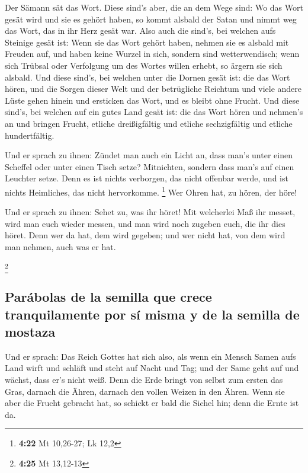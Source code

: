  Der Sämann sät das Wort.  Diese sind's
aber, die an dem Wege sind: Wo das Wort gesät wird und sie es gehört
haben, so kommt alsbald der Satan und nimmt weg das Wort, das in ihr
Herz gesät war.  Also auch die sind's, bei welchen aufs
Steinige gesät ist: Wenn sie das Wort gehört haben, nehmen sie es
alsbald mit Freuden auf,  und haben keine Wurzel in sich,
sondern sind wetterwendisch; wenn sich Trübsal oder Verfolgung um des
Wortes willen erhebt, so ärgern sie sich alsbald.  Und
diese sind's, bei welchen unter die Dornen gesät ist: die das Wort
hören,  und die Sorgen dieser Welt und der betrügliche
Reichtum und viele andere Lüste gehen hinein und ersticken das Wort, und
es bleibt ohne Frucht.  Und diese sind's, bei welchen auf
ein gutes Land gesät ist: die das Wort hören und nehmen's an und bringen
Frucht, etliche dreißigfältig und etliche sechzigfältig und etliche
hundertfältig.

 Und er sprach zu ihnen: Zündet man auch ein Licht an,
dass man's unter einen Scheffel oder unter einen Tisch setze?
Mitnichten, sondern dass man's auf einen Leuchter setze. 
Denn es ist nichts verborgen, das nicht offenbar werde, und ist nichts
Heimliches, das nicht hervorkomme. \footnote{\textbf{4:22} Mt 10,26-27;
  Lk 12,2}  Wer Ohren hat, zu hören, der höre!

 Und er sprach zu ihnen: Sehet zu, was ihr höret! Mit
welcherlei Maß ihr messet, wird man euch wieder messen, und man wird
noch zugeben euch, die ihr dies höret.  Denn wer da hat,
dem wird gegeben; und wer nicht hat, von dem wird man nehmen, auch was
er hat.

\footnote{\textbf{4:25} Mt 13,12-13}

\hypertarget{paruxe1bolas-de-la-semilla-que-crece-tranquilamente-por-suxed-misma-y-de-la-semilla-de-mostaza}{%
\subsection{Parábolas de la semilla que crece tranquilamente por sí
misma y de la semilla de
mostaza}\label{paruxe1bolas-de-la-semilla-que-crece-tranquilamente-por-suxed-misma-y-de-la-semilla-de-mostaza}}

 Und er sprach: Das Reich Gottes hat sich also, als wenn
ein Mensch Samen aufs Land wirft  und schläft und steht
auf Nacht und Tag; und der Same geht auf und wächst, dass er's nicht
weiß.  Denn die Erde bringt von selbst zum ersten das
Gras, darnach die Ähren, darnach den vollen Weizen in den Ähren.
 Wenn sie aber die Frucht gebracht hat, so schickt er
bald die Sichel hin; denn die Ernte ist da.

